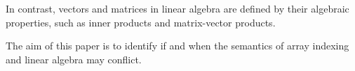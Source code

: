 
In contrast, vectors and matrices in linear algebra are defined by their
algebraic properties, such as inner products and matrix-vector products.

The aim of this paper is to identify if and when the semantics of array
indexing and linear algebra may conflict.
